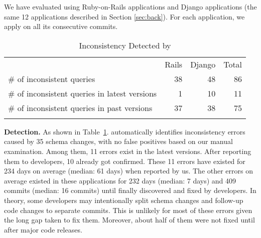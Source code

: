 

% 


We have evaluated \Tool{} using \numRailsApp Ruby-on-Rails applications and \numDjangoApp Django applications (the same 12 applications described in
Section \ref{sec:back}). 
For each application, we apply \Tool{} on all its consecutive commits.  

\begin{table}
\caption{Inconsistency Detected by \Tool}
\label{tab:evaluation}
\centering
\begin{tabular}{lrrr}
\arrayrulecolor{black}\hline  
\arrayrulecolor{black}\hline
 & Rails  & Django  & Total\\
\# of inconsistent queries & 38 & 48 & 86\\
\# of inconsistent queries in latest versions &  1 & 10 & 11\\
\# of inconsistent queries in past versions & 37 & 38 & 75\\
\arrayrulecolor{black}\hline  
\arrayrulecolor{black}\hline
\end{tabular}
\end{table}


\textbf{Detection.} As shown in Table~\ref{tab:evaluation}. \Tool{} automatically identifies \numRailsError inconsistency errors caused by 35 schema changes, with no false positives based on our manual examination. Among them, 11 errors  exist in the latest versions. After reporting
them to developers,
10 already got confirmed. These 11 errors have existed for 234 days on average (median: 61 days) when reported by us. 
The other \numFixed errors on average existed in these applications
for 232 days (median: 7 days) and 409 commits (median: 16 commits)
until finally discovered and fixed by developers.
In theory, some developers may intentionally
split schema changes and follow-up code changes to separate commits.
This is unlikely for most of these errors given the long gap taken to fix
them.
Moreover, about half of them were not fixed until after major code releases.

